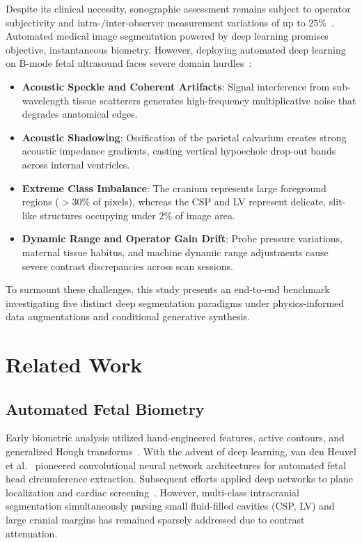 \documentclass[conference]{IEEEtran}
\begin{document}
Despite its clinical necessity, sonographic assessment remains subject to operator subjectivity and intra-/inter-observer measurement variations of up to $25\%$~\cite{van2018automated}. Automated medical image segmentation powered by deep learning promises objective, instantaneous biometry. However, deploying automated deep learning on B-mode fetal ultrasound faces severe domain hurdles~\cite{noble2006ultrasound}:
\begin{itemize}
    \item \textbf{Acoustic Speckle and Coherent Artifacts}: Signal interference from sub-wavelength tissue scatterers generates high-frequency multiplicative noise that degrades anatomical edges.
    \item \textbf{Acoustic Shadowing}: Ossification of the parietal calvarium creates strong acoustic impedance gradients, casting vertical hypoechoic drop-out bands across internal ventricles.
    \item \textbf{Extreme Class Imbalance}: The cranium represents large foreground regions ($>30\%$ of pixels), whereas the CSP and LV represent delicate, slit-like structures occupying under $2\%$ of image area.
    \item \textbf{Dynamic Range and Operator Gain Drift}: Probe pressure variations, maternal tissue habitus, and machine dynamic range adjustments cause severe contrast discrepancies across scan sessions.
\end{itemize}

To surmount these challenges, this study presents an end-to-end benchmark investigating five distinct deep segmentation paradigms under physics-informed data augmentations and conditional generative synthesis.

\section{Related Work}
\label{sec:related}

\subsection{Automated Fetal Biometry}
Early biometric analysis utilized hand-engineered features, active contours, and generalized Hough transforms~\cite{noble2006ultrasound}. With the advent of deep learning, van den Heuvel et al.~\cite{van2018automated} pioneered convolutional neural network architectures for automated fetal head circumference extraction. Subsequent efforts applied deep networks to plane localization and cardiac screening~\cite{komatsu2021detection}. However, multi-class intracranial segmentation simultaneously parsing small fluid-filled cavities (CSP, LV) and large cranial margins has remained sparsely addressed due to contrast attenuation.
\end{document}

